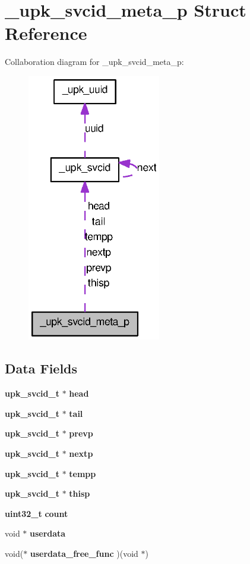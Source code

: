 \section{\_\-upk\_\-svcid\_\-meta\_\-p Struct Reference}
\label{struct__upk__svcid__meta__p}


Collaboration diagram for \_\-upk\_\-svcid\_\-meta\_\-p:
\nopagebreak
\begin{figure}[H]
\begin{center}
\leavevmode
\includegraphics[width=165pt]{struct__upk__svcid__meta__p__coll__graph}
\end{center}
\end{figure}
\subsection*{Data Fields}
\begin{DoxyCompactItemize}
\item 
{\bf upk\_\-svcid\_\-t} $\ast$ {\bf head}
\item 
{\bf upk\_\-svcid\_\-t} $\ast$ {\bf tail}
\item 
{\bf upk\_\-svcid\_\-t} $\ast$ {\bf prevp}
\item 
{\bf upk\_\-svcid\_\-t} $\ast$ {\bf nextp}
\item 
{\bf upk\_\-svcid\_\-t} $\ast$ {\bf tempp}
\item 
{\bf upk\_\-svcid\_\-t} $\ast$ {\bf thisp}
\item 
{\bf uint32\_\-t} {\bf count}
\item 
void $\ast$ {\bf userdata}
\item 
void($\ast$ {\bf userdata\_\-free\_\-func} )(void $\ast$)
\end{DoxyCompactItemize}


